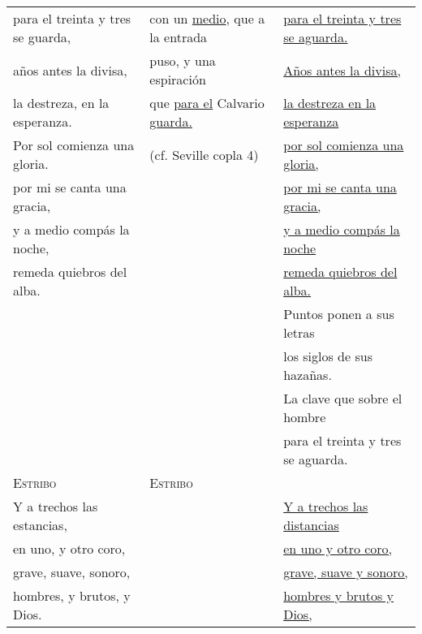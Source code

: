 \documentclass{aac-table}
\newcommand{\str}{\hspace{1em}}
\begin{document}
\begin{longtable}{lll}
    para el treinta y tres se guarda,
    & con un \uline{medio}, que a la entrada &
    \uline{para el treinta y tres se aguarda.} \\

    años antes la divisa,
    & puso, y una espiración & 
    \str{} \uline{Años antes la divisa,} \\

    la destreza, en la esperanza.
    & que \uline{para el} Calvario \uline{guarda.} & 
    \uline{la destreza en la esperanza} \\

    \str{} Por sol comienza una gloria. & 
    (cf. Seville copla 4) & 
    \uline{por sol comienza una gloria,} \\

    por mi se canta una gracia, &
    &
    \uline{por mi se canta una gracia,} \\

    y a medio compás la noche, &
    &
    \uline{y a medio compás la noche} \\

    remeda quiebros del alba. &
    &
    \uline{remeda quiebros del alba.} \\
  
    & &
    \str{} Puntos ponen a sus letras \\
   
    & & 
    los siglos de sus hazañas. \\

    & & 
    La clave que sobre el hombre \\

    & & 
    para el treinta y tres se aguarda. \\

    \addlinespace

    \textsc{Estribo} &
    \textsc{Estribo} &
    \\

    \str{} Y a trechos las estancias, &
    &
    \str{} \uline{Y a trechos las distancias} \\

    en uno, y otro coro, &
    &
    \uline{en uno y otro coro,} \\

    grave, suave, sonoro, &
    &
    \uline{grave, suave y sonoro,} \\

    hombres, y brutos, y Dios. &
    &
    \uline{hombres y brutos y Dios,} \\


\end{longtable}
\end{document}
